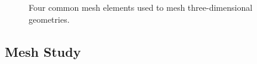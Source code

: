 \begin{figure}
  \caption{Four common mesh elements used to mesh three-dimensional geometries.}
  \label{fig:3d_elements}
\end{figure}




\subsection{Mesh Study}
